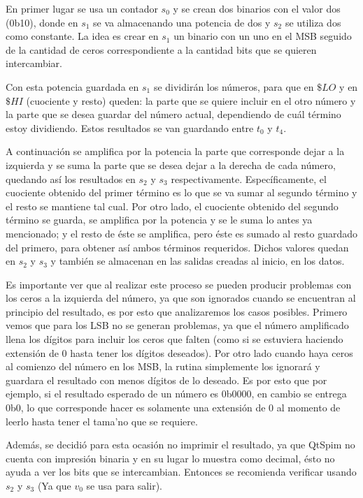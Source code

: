 \documentclass[11pt,letterpaper]{article}
\begin{document}
En primer lugar se usa un contador $s_0$ y se crean dos binarios con el valor dos (0b10), donde en $s_1$ se va almacenando una potencia de dos y $s_2$ se utiliza dos como constante. La idea es crear en $s_1$ un binario con un uno en el MSB seguido de la cantidad de ceros correspondiente a la cantidad bits que se quieren intercambiar.

Con esta potencia guardada en $s_1$ se dividirán los números, para que en $\$LO$ y en $\$HI$ (cuociente y resto) queden: la parte que se quiere incluir en el otro número y la parte que se desea guardar del número actual, dependiendo de cuál término estoy dividiendo. Estos resultados se van guardando entre $t_0$ y $t_4$.

A continuación se amplifica por la potencia la parte que corresponde dejar a la izquierda y se suma la parte que se desea dejar a la derecha de cada número, quedando así los resultados en $s_2$ y $s_3$ respectivamente. Específicamente, el cuociente obtenido del primer término es lo que se va sumar al segundo término y el resto se mantiene tal cual. Por otro lado, el cuociente obtenido del segundo término se guarda, se amplifica por la potencia y se le suma lo antes ya mencionado; y el resto de éste se amplifica, pero éste es sumado al resto guardado del primero, para obtener así ambos términos requeridos. Dichos valores quedan en $s_2$ y $s_3$ y también se almacenan en las salidas creadas al inicio, en los datos.

Es importante ver que al realizar este proceso se pueden producir problemas con los ceros a la izquierda del número, ya que son ignorados cuando se encuentran al principio del resultado, es por esto que analizaremos los casos posibles. Primero vemos que para los LSB no se generan problemas, ya que el número amplificado llena los dígitos para incluir los ceros que falten (como si se estuviera haciendo extensión de $0$ hasta tener los dígitos deseados). Por otro lado cuando haya ceros al comienzo del número en los MSB, la rutina simplemente los ignorará y guardara el resultado con menos dígitos de lo deseado. Es por esto que por ejemplo, si el resultado esperado de un número es 0b0000, en cambio se entrega 0b0, lo que corresponde hacer es solamente una extensión de $0$ al momento de leerlo hasta tener el tama'no que se requiere.

Además, se decidió para esta ocasión no imprimir el resultado, ya que QtSpim no cuenta con impresión binaria y en su lugar lo muestra como decimal, ésto no ayuda a ver los bits que se intercambian. Entonces se recomienda verificar usando $s_2$ y $s_3$ (Ya que $v_0$ se usa para salir).
\end{document}
